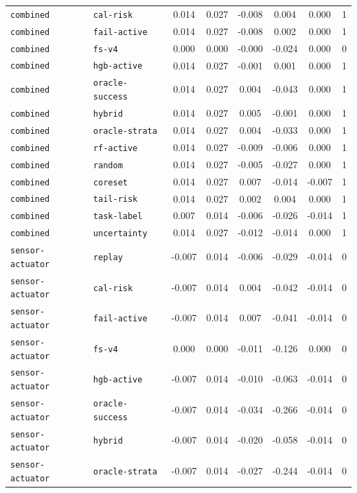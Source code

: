 \documentclass{article}
\begin{document}
\begin{center}
\begin{tabular}{llcccccc}
\texttt{combined} & \texttt{cal-risk} & 0.014 & 0.027 & -0.008 & 0.004 & 0.000 & 1 \\
\texttt{combined} & \texttt{fail-active} & 0.014 & 0.027 & -0.008 & 0.002 & 0.000 & 1 \\
\texttt{combined} & \texttt{fs-v4} & 0.000 & 0.000 & -0.000 & -0.024 & 0.000 & 0 \\
\texttt{combined} & \texttt{hgb-active} & 0.014 & 0.027 & -0.001 & 0.001 & 0.000 & 1 \\
\texttt{combined} & \texttt{oracle-success} & 0.014 & 0.027 & 0.004 & -0.043 & 0.000 & 1 \\
\texttt{combined} & \texttt{hybrid} & 0.014 & 0.027 & 0.005 & -0.001 & 0.000 & 1 \\
\texttt{combined} & \texttt{oracle-strata} & 0.014 & 0.027 & 0.004 & -0.033 & 0.000 & 1 \\
\texttt{combined} & \texttt{rf-active} & 0.014 & 0.027 & -0.009 & -0.006 & 0.000 & 1 \\
\texttt{combined} & \texttt{random} & 0.014 & 0.027 & -0.005 & -0.027 & 0.000 & 1 \\
\texttt{combined} & \texttt{coreset} & 0.014 & 0.027 & 0.007 & -0.014 & -0.007 & 1 \\
\texttt{combined} & \texttt{tail-risk} & 0.014 & 0.027 & 0.002 & 0.004 & 0.000 & 1 \\
\texttt{combined} & \texttt{task-label} & 0.007 & 0.014 & -0.006 & -0.026 & -0.014 & 1 \\
\texttt{combined} & \texttt{uncertainty} & 0.014 & 0.027 & -0.012 & -0.014 & 0.000 & 1 \\
\texttt{sensor-actuator} & \texttt{replay} & -0.007 & 0.014 & -0.006 & -0.029 & -0.014 & 0 \\
\texttt{sensor-actuator} & \texttt{cal-risk} & -0.007 & 0.014 & 0.004 & -0.042 & -0.014 & 0 \\
\texttt{sensor-actuator} & \texttt{fail-active} & -0.007 & 0.014 & 0.007 & -0.041 & -0.014 & 0 \\
\texttt{sensor-actuator} & \texttt{fs-v4} & 0.000 & 0.000 & -0.011 & -0.126 & 0.000 & 0 \\
\texttt{sensor-actuator} & \texttt{hgb-active} & -0.007 & 0.014 & -0.010 & -0.063 & -0.014 & 0 \\
\texttt{sensor-actuator} & \texttt{oracle-success} & -0.007 & 0.014 & -0.034 & -0.266 & -0.014 & 0 \\
\texttt{sensor-actuator} & \texttt{hybrid} & -0.007 & 0.014 & -0.020 & -0.058 & -0.014 & 0 \\
\texttt{sensor-actuator} & \texttt{oracle-strata} & -0.007 & 0.014 & -0.027 & -0.244 & -0.014 & 0 \\
\bottomrule
\end{tabular}
\end{center}
\end{document}
